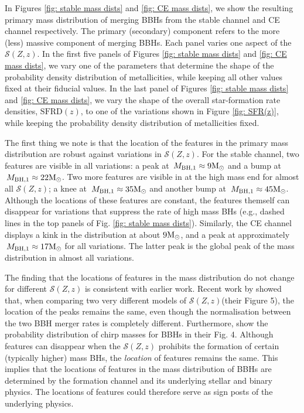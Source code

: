 \documentclass[twocolumn]{aastex631}
\newcommand{\Msun}{\ensuremath{\rm{M}_{\odot}}\xspace}
\newcommand{\Mbheen}{\ensuremath{\,M_{\rm BH, 1}}\xspace}
\newcommand{\SFRDzZ}{\ensuremath{\mathcal{S}(Z,z)}\xspace}
\newcommand{\SFRDz}{\ensuremath{\mathrm{SFRD}(z)}\xspace}
\begin{document}
In Figures \ref{fig: stable mass dists} and \ref{fig: CE mass dists}, we show the resulting primary mass distribution of merging BBHs from the stable channel and CE channel respectively.
The primary (secondary) component refers to the more (less) massive component of merging BBHs. 
Each panel varies one aspect of the \SFRDzZ. In the first five panels of Figures \ref{fig: stable mass dists} and \ref{fig: CE mass dists}, we vary one of the  parameters that determine the shape of the probability density distribution of metallicities, while keeping all other values fixed at their fiducial values. In the last panel of  Figures \ref{fig: stable mass dists} and \ref{fig: CE mass dists}, we vary the shape of the overall star-formation rate densities, \SFRDz, to one of the variations shown in Figure \ref{fig: SFR(z)}, while keeping the probability density distribution of metallicities fixed.


The first thing we note is that the location of the features in the primary mass distribution are robust against variations in \SFRDzZ.
For the stable channel, two features are visible in all variations: a peak at $\Mbheen\approx9\Msun$ and a bump at $\Mbheen\approx22\Msun$. 
Two more features are visible in at the high mass end for almost all \SFRDzZ; a knee at $\Mbheen\approx35\Msun$ and another bump at $\Mbheen\approx45\Msun$. Although the locations of these features are constant, the features themself can disappear for variations that suppress the rate of high mass BHs (e.g., dashed lines in the top panels of Fig. \ref{fig: stable mass dists}).  
Similarly, the CE channel displays a kink in the distribution at about $9\Msun$, and a peak at approximately $\Mbheen\approx17\Msun$ for all variations. The latter peak is the global peak of the mass distribution in almost all variations.  

The finding that the locations of features in the mass distribution do not change for different \SFRDzZ is consistent with earlier work. 
%
Recent work by \cite{chruslinska2022_review} showed that, when comparing two very different models of \SFRDzZ (their Figure 5), the location of the peaks remains the same, even though the normalisation between the two BBH merger rates is completely different. 
%
Furthermore, \cite{Broekgaarden+2021b} show the probability distribution of chirp masses for BBHs in their Fig. 4. Although features can disappear when the \SFRDzZ prohibits the formation of certain (typically higher) mass BHs, the \textit{location} of features remains the same.
%
This implies that the locations of features in the mass distribution of BBHs are determined by the formation channel and its underlying stellar and binary physics. The locations of features could therefore serve as sign posts of the underlying physics. \\
\end{document}
